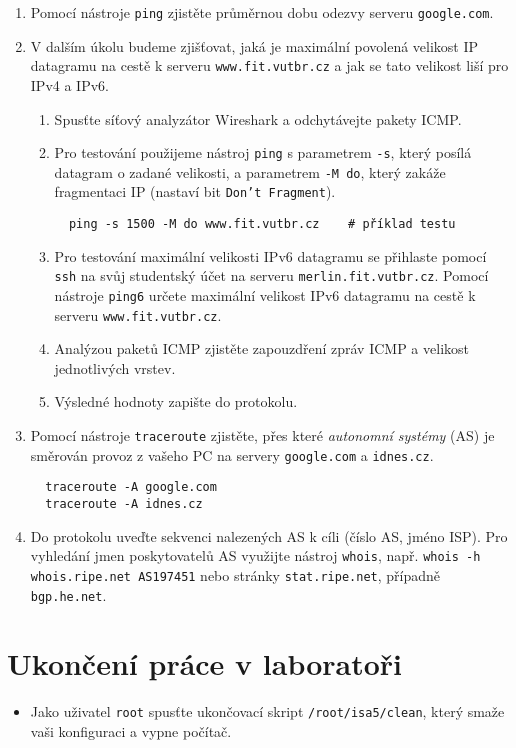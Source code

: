 \documentclass[a4paper,11pt]{article}
\begin{document}
\begin{enumerate}
  \item Pomocí nástroje \texttt{ping} zjistěte průměrnou dobu odezvy serveru \texttt{google.com}.
  \item V dalším úkolu budeme zjišťovat, jaká je maximální povolená velikost IP datagramu na cestě k serveru \texttt{www.fit.vutbr.cz} a jak se tato velikost liší pro IPv4 a IPv6.
  \begin{enumerate}
    \item Spusťte síťový analyzátor Wireshark a odchytávejte pakety ICMP.
    \item Pro testování použijeme nástroj {\tt ping} s parametrem \texttt{-s}, který posílá datagram o zadané velikosti, a parametrem \texttt{-M do}, který zakáže fragmentaci IP (nastaví bit \texttt{Don't Fragment}).
\begin{verbatim}
  ping -s 1500 -M do www.fit.vutbr.cz    # příklad testu        
\end{verbatim}
    \item Pro testování maximální velikosti IPv6 datagramu se přihlaste pomocí {\tt ssh} na svůj studentský účet na serveru {\tt merlin.fit.vutbr.cz}. Pomocí nástroje {\tt ping6} určete maximální velikost IPv6 datagramu na cestě k serveru \texttt{www.fit.vutbr.cz}.
    \item Analýzou paketů ICMP  zjistěte zapouzdření zpráv ICMP a velikost jednotlivých vrstev.
    \item Výsledné hodnoty zapište do protokolu. 
  \end{enumerate}
  \item Pomocí nástroje \texttt{traceroute} zjistěte, přes které {\em autonomní systémy} (AS) je směrován provoz z vašeho PC na servery \texttt{google.com} a \texttt{idnes.cz}.
\begin{verbatim}
  traceroute -A google.com
  traceroute -A idnes.cz
\end{verbatim}
  \item Do protokolu uveďte sekvenci nalezených AS k cíli (číslo AS, jméno ISP). Pro vyhledání jmen poskytovatelů AS využijte nástroj {\tt whois}, např. \texttt{whois -h whois.ripe.net AS197451} nebo stránky \texttt{stat.ripe.net}, případně \texttt{bgp.he.net}.
\end{enumerate}

\section*{Ukončení práce v laboratoři}
\begin{itemize}
  \item Jako uživatel {\tt root} spusťte ukončovací skript {\tt /root/isa5/clean}, který smaže vaši konfiguraci a vypne počítač. 
\end{itemize}
\end{document}
